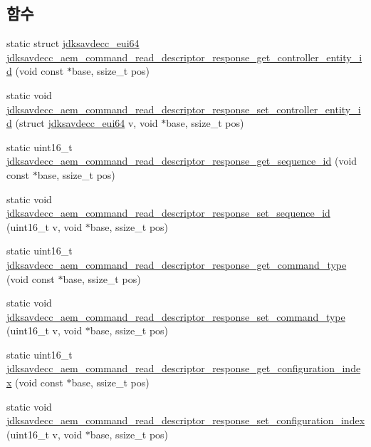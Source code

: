\subsection*{함수}
\begin{DoxyCompactItemize}
\item 
static struct \hyperlink{structjdksavdecc__eui64}{jdksavdecc\+\_\+eui64} \hyperlink{group__command__read__descriptor__response_ga0422cfefcf5fd5efe030e6e94a598b2e}{jdksavdecc\+\_\+aem\+\_\+command\+\_\+read\+\_\+descriptor\+\_\+response\+\_\+get\+\_\+controller\+\_\+entity\+\_\+id} (void const $\ast$base, ssize\+\_\+t pos)
\item 
static void \hyperlink{group__command__read__descriptor__response_gae537ad97ebe9089a2ce90087062cd0a6}{jdksavdecc\+\_\+aem\+\_\+command\+\_\+read\+\_\+descriptor\+\_\+response\+\_\+set\+\_\+controller\+\_\+entity\+\_\+id} (struct \hyperlink{structjdksavdecc__eui64}{jdksavdecc\+\_\+eui64} v, void $\ast$base, ssize\+\_\+t pos)
\item 
static uint16\+\_\+t \hyperlink{group__command__read__descriptor__response_ga97bc5e9edc4cfabcc82bce34606cd322}{jdksavdecc\+\_\+aem\+\_\+command\+\_\+read\+\_\+descriptor\+\_\+response\+\_\+get\+\_\+sequence\+\_\+id} (void const $\ast$base, ssize\+\_\+t pos)
\item 
static void \hyperlink{group__command__read__descriptor__response_gaea95e392013a0263910f4ec162297ed3}{jdksavdecc\+\_\+aem\+\_\+command\+\_\+read\+\_\+descriptor\+\_\+response\+\_\+set\+\_\+sequence\+\_\+id} (uint16\+\_\+t v, void $\ast$base, ssize\+\_\+t pos)
\item 
static uint16\+\_\+t \hyperlink{group__command__read__descriptor__response_ga9de4f7f5f1e7b01b1416e771e37fcb1c}{jdksavdecc\+\_\+aem\+\_\+command\+\_\+read\+\_\+descriptor\+\_\+response\+\_\+get\+\_\+command\+\_\+type} (void const $\ast$base, ssize\+\_\+t pos)
\item 
static void \hyperlink{group__command__read__descriptor__response_ga6824821bf12eb98197e029846857b392}{jdksavdecc\+\_\+aem\+\_\+command\+\_\+read\+\_\+descriptor\+\_\+response\+\_\+set\+\_\+command\+\_\+type} (uint16\+\_\+t v, void $\ast$base, ssize\+\_\+t pos)
\item 
static uint16\+\_\+t \hyperlink{group__command__read__descriptor__response_ga0d1826279430f6203f212b1851732796}{jdksavdecc\+\_\+aem\+\_\+command\+\_\+read\+\_\+descriptor\+\_\+response\+\_\+get\+\_\+configuration\+\_\+index} (void const $\ast$base, ssize\+\_\+t pos)
\item 
static void \hyperlink{group__command__read__descriptor__response_gacf45eca03e53ea231c288102f21b64a5}{jdksavdecc\+\_\+aem\+\_\+command\+\_\+read\+\_\+descriptor\+\_\+response\+\_\+set\+\_\+configuration\+\_\+index} (uint16\+\_\+t v, void $\ast$base, ssize\+\_\+t pos)

\end{DoxyCompactItemize}
